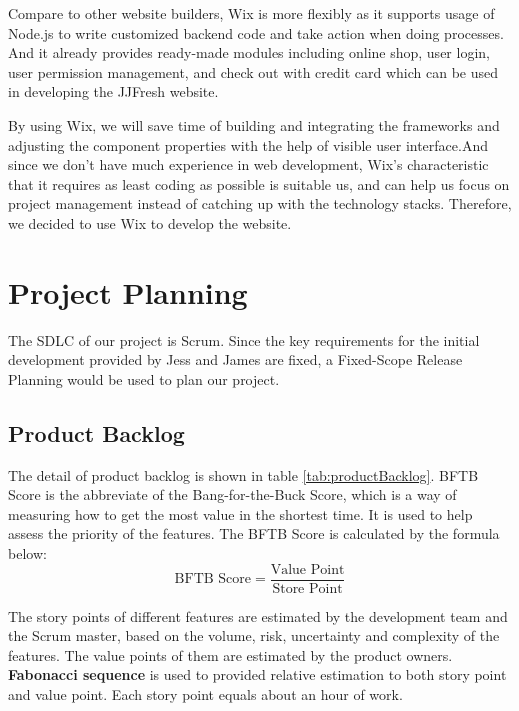 \documentclass{report}
\begin{document}
Compare to other website builders, Wix is more flexibly as it supports usage of Node.js to write customized backend code and take action when doing processes. And it already provides ready-made modules including online shop, user login, user permission management, and check out with credit card which can be used in developing the JJFresh website.

By using Wix, we will save time of building and integrating the frameworks and adjusting the component properties with the help of visible user interface.And since we don't have much experience in web development, Wix's characteristic that it requires as least coding as possible is suitable us, and can help us focus on project management instead of catching up with the technology stacks. Therefore, we decided to use Wix to develop the website.

\section{Project Planning}
\label{sec:projectPlanning}
The SDLC of our project is Scrum. Since the key requirements for the initial development provided by Jess and James are fixed, a Fixed-Scope Release Planning would be used to plan our project.

\subsection{Product Backlog}
The detail of product backlog is shown in table \ref{tab:productBacklog}. BFTB Score is the abbreviate of the Bang-for-the-Buck Score, which is a way of measuring how to get the most value in the shortest time. It is used to help assess the priority of the features. The BFTB Score is calculated by the formula below:
$$
  \text{BFTB Score} = \frac{\text{Value Point}}{\text{Store Point}}
$$

The story points of different features are estimated by the development team and the Scrum master, based on the volume, risk, uncertainty and complexity of the features. The value points of them are estimated by the product owners. \textbf{Fabonacci sequence} is used to provided relative estimation to both story point and value point. Each story point equals about an hour of work.
\end{document}
